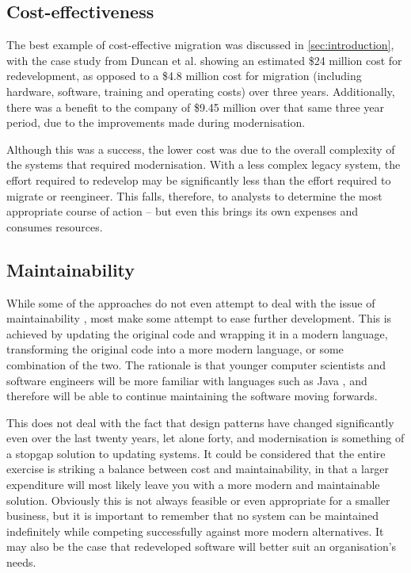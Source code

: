 \documentclass[12pt,journal,compsoc]{IEEEtran}
\begin{document}
\subsection{Cost-effectiveness}
\label{subsec:costeffectiveness}
The best example of cost-effective migration was discussed in \autoref{sec:introduction}, with the case study from Duncan et al. \cite{Duncan1996} showing an estimated \$24 million cost for redevelopment, as opposed to a \$4.8 million cost for migration (including hardware, software, training and operating costs) over three years. Additionally, there was a benefit to the company of \$9.45 million over that same three year period, due to the improvements made during modernisation.

Although this was a success, the lower cost was due to the overall complexity of the systems that required modernisation. With a less complex legacy system, the effort required to redevelop may be significantly less than the effort required to migrate or reengineer. This falls, therefore, to analysts to determine the most appropriate course of action -- but even this brings its own expenses and consumes resources.

\subsection{Maintainability}
\label{subsec:maintainability}
While some of the approaches do not even attempt to deal with the issue of maintainability \cite{Stroulia2002}, most make some attempt to ease further development. This is achieved by updating the original code and wrapping it in a modern language, transforming the original code into a more modern language, or some combination of the two. The rationale is that younger computer scientists and software engineers will be more familiar with languages such as Java \cite{Sneed2013}, and therefore will be able to continue maintaining the software moving forwards.

This does not deal with the fact that design patterns have changed significantly even over the last twenty years, let alone forty, and modernisation is something of a stopgap solution to updating systems. It could be considered that the entire exercise is striking a balance between cost and maintainability, in that a larger expenditure will most likely leave you with a more modern and maintainable solution. Obviously this is not always feasible or even appropriate for a smaller business, but it is important to remember that no system can be maintained indefinitely while competing successfully against more modern alternatives. It may also be the case that redeveloped software will better suit an organisation's needs.
\end{document}
